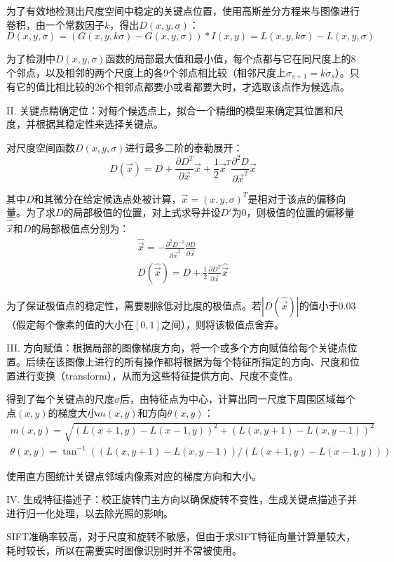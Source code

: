   为了有效地检测出尺度空间中稳定的关键点位置，使用高斯差分方程来与图像进行卷积，由一个常数因子$k$，得出$D(x,y,\sigma)$：
$$D(x,y,\sigma)=(G(x,y,k\sigma)-G(x,y,\sigma))\ast I(x,y)=L(x,y,k\sigma)-L(x,y,\sigma)$$

  为了检测中$D(x,y,\sigma)$函数的局部最大值和最小值，每个点都与它在同尺度上的8个邻点，以及相邻的两个尺度上的各9个邻点相比较（相邻尺度上$\sigma_{s+1}=k\dot\sigma_s$）。只有它的值比相比较的26个相邻点都要小或者都要大时，才选取该点作为候选点。

  II. 关键点精确定位：对每个候选点上，拟合一个精细的模型来确定其位置和尺度，并根据其稳定性来选择关键点。

  对尺度空间函数$D(x,y,\sigma)$进行最多二阶的泰勒展开：
$$D(\vec{x})=D+\frac{\partial D^T}{\partial \vec{x}}\vec{x}+\frac{1}{2}\vec{x}^T\frac{\partial^2D}{\partial\vec{x}^2}\vec{x}$$

  其中$D$和其微分在给定候选点处被计算，$\vec{x}=(x,y,\sigma)^T$是相对于该点的偏移向量。为了求$D$的局部极值的位置，对上式求导并设$D'$为0，则极值的位置的偏移量$\hat{\vec{x}}$和$D$的局部极值点分别为：
\begin{gather*}
\hat{\vec{x}}=-\frac{\partial^2 D^{-1}}{\partial \vec{x}^2}\frac{\partial D}{\partial \vec{x}}\\
D(\hat{\vec{x}})=D+\frac{1}{2} \frac{\partial D^T}{\partial \vec{x}} \hat{\vec{x}}
\end{gather*}

  为了保证极值点的稳定性，需要剔除低对比度的极值点。若$|D(\hat{\vec{x}})|$的值小于0.03（假定每个像素的值的大小在$[0,1]$之间），则将该极值点舍弃。

  III. 方向赋值：根据局部的图像梯度方向，将一个或多个方向赋值给每个关键点位置。后续在该图像上进行的所有操作都将根据为每个特征所指定的方向、尺度和位置进行变换（transform），从而为这些特征提供方向、尺度不变性。

  得到了每个关键点的尺度$\sigma$后，由特征点为中心，计算出同一尺度下周围区域每个点$(x,y)$的梯度大小$m(x,y)$和方向$\theta(x,y)$：
\begin{gather*}
m(x,y)=\sqrt{(L(x+1,y)-L(x-1,y))^2+(L(x,y+1)-L(x,y-1))^2}\\
\theta(x,y)=\tan^{-1}((L(x,y+1)-L(x,y-1))/(L(x+1,y)-L(x-1,y)))
\end{gather*}

  使用直方图统计关键点邻域内像素对应的梯度方向和大小。

  IV. 生成特征描述子：校正旋转门主方向以确保旋转不变性，生成关键点描述子并进行归一化处理，以去除光照的影响。

  SIFT准确率较高，对于尺度和旋转不敏感，但由于求SIFT特征向量计算量较大，耗时较长，所以在需要实时图像识别时并不常被使用。

